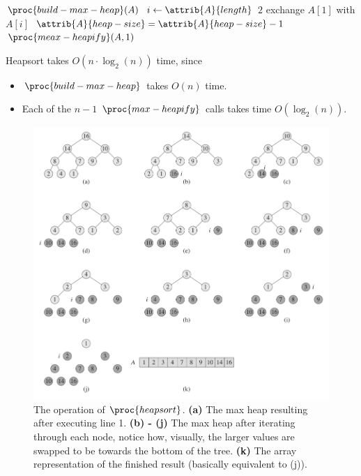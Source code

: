 \documentclass[12pt]{article}
\begin{document}
\begin{codebox}
\li $\proc{build-max-heap}(A)$
\li \For $i \gets \attrib{A}{length}$ \Downto $2$
\li \Do
        exchange $A[1]$ with $A[i]$
\li     $\attrib{A}{heap-size} = \attrib{A}{heap-size} - 1$
\li     $\proc{meax-heapify}(A, 1)$
    \End
\end{codebox}

Heapsort takes $O(n \cdot \log_2(n))$ time, since
\begin{itemize}
    \item $\proc{build-max-heap}$ takes $O(n)$ time.
    \item Each of the $n-1$ $\proc{max-heapify}$ calls takes time $O(\log_2(n))$.
\end{itemize}

\newpage

\begin{figure}[!ht]
\centering
\includegraphics[scale=0.65]{heapsort}
\caption{
  The operation of $\proc{heapsort}$. \textbf{(a)} The max heap resulting after executing line 1. \textbf{(b) - (j)} The max heap after iterating through each node, notice how, visually, the larger values are swapped to be towards the bottom of the tree. \textbf{(k)} The array representation of the finished result (basically equivalent to (j)).
}
\label{fig:heapsort}
\end{figure}
\end{document}
